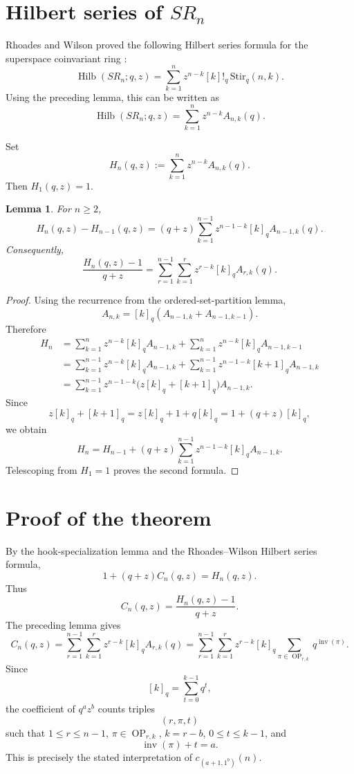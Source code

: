 \documentclass[11pt]{article}
\newtheorem{lemma}[theorem]{Lemma}
\DeclareMathOperator{\Hilb}{Hilb}
\DeclareMathOperator{\Inv}{inv}
\DeclareMathOperator{\OP}{OP}
\begin{document}
\section{Hilbert series of \(SR_n\)}

Rhoades and Wilson proved the following Hilbert series formula for the superspace
coinvariant ring \cite[Theorem~1.1 and Eq.~(1.10)]{RhoadesWilson}:
\[
\Hilb(SR_n;q,z)=
\sum_{k=1}^{n} z^{n-k}[k]!_q\,\mathrm{Stir}_q(n,k).
\]
Using the preceding lemma, this can be written as
\[
\Hilb(SR_n;q,z)=
\sum_{k=1}^{n}z^{n-k}A_{n,k}(q).
\]

Set
\[
H_n(q,z):=\sum_{k=1}^{n}z^{n-k}A_{n,k}(q).
\]
Then \(H_1(q,z)=1\).

\begin{lemma}
For \(n\geq 2\),
\[
H_n(q,z)-H_{n-1}(q,z)
=
(q+z)\sum_{k=1}^{n-1} z^{n-1-k}[k]_q A_{n-1,k}(q).
\]
Consequently,
\[
\frac{H_n(q,z)-1}{q+z}
=
\sum_{r=1}^{n-1}\sum_{k=1}^{r}
z^{r-k}[k]_q A_{r,k}(q).
\]
\end{lemma}

\begin{proof}
Using the recurrence from the ordered-set-partition lemma,
\[
A_{n,k}=[k]_q(A_{n-1,k}+A_{n-1,k-1}).
\]
Therefore
\[
\begin{aligned}
H_n
&=
\sum_{k=1}^{n} z^{n-k}[k]_qA_{n-1,k}
+
\sum_{k=1}^{n} z^{n-k}[k]_qA_{n-1,k-1}  \\
&=
\sum_{k=1}^{n-1} z^{n-k}[k]_qA_{n-1,k}
+
\sum_{k=1}^{n-1} z^{n-1-k}[k+1]_qA_{n-1,k} \\
&=
\sum_{k=1}^{n-1} z^{n-1-k}
\bigl(z[k]_q+[k+1]_q\bigr)A_{n-1,k}.
\end{aligned}
\]
Since
\[
z[k]_q+[k+1]_q
=
z[k]_q+1+q[k]_q
=
1+(q+z)[k]_q,
\]
we obtain
\[
H_n
=
H_{n-1}
+
(q+z)\sum_{k=1}^{n-1} z^{n-1-k}[k]_qA_{n-1,k}.
\]
Telescoping from \(H_1=1\) proves the second formula.
\end{proof}

\section{Proof of the theorem}

By the hook-specialization lemma and the Rhoades--Wilson Hilbert series formula,
\[
1+(q+z)C_n(q,z)
=
H_n(q,z).
\]
Thus
\[
C_n(q,z)=\frac{H_n(q,z)-1}{q+z}.
\]
The preceding lemma gives
\[
C_n(q,z)
=
\sum_{r=1}^{n-1}\sum_{k=1}^{r}
z^{r-k}[k]_qA_{r,k}(q)
=
\sum_{r=1}^{n-1}\sum_{k=1}^{r}
z^{r-k}[k]_q
\sum_{\pi\in \OP_{r,k}}q^{\Inv(\pi)}.
\]
Since
\[
[k]_q=\sum_{t=0}^{k-1}q^t,
\]
the coefficient of \(q^a z^b\) counts triples
\[
(r,\pi,t)
\]
such that \(1\leq r\leq n-1\), \(\pi\in \OP_{r,k}\), \(k=r-b\), \(0\leq t\leq k-1\),
and
\[
\Inv(\pi)+t=a.
\]
This is precisely the stated interpretation of \(c_{(a+1,1^b)}(n)\).
\end{document}
